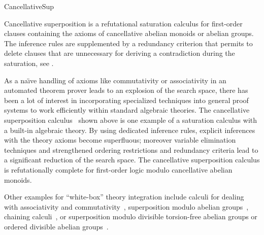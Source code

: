 \begin{entry}{CancellativeSup}
\begin{clarifications}
Cancellative superposition is a refutational saturation calculus for
first-order clauses containing the axioms of
cancellative abelian monoids or abelian groups.
The inference rules are supplemented by a redundancy criterion
that permits to delete clauses that are unnecessary for
deriving a contradiction during the saturation, see .
\end{clarifications}

\begin{history}
As a na{\"\i}ve handling of axioms like commutativity or associativity
in an automated theorem prover
leads to an explosion of the search space,
there has been a lot of interest in
incorporating specialized techniques into general proof systems
to work efficiently within standard algebraic theories.
The cancellative superposition calculus~\cite{GanzingerWaldmann1996CADE}
shown above
is one example of a saturation calculus with a built-in algebraic theory.
By using dedicated inference rules,
explicit inferences with the theory axioms become superfluous;
moreover variable elimination techniques
and strengthened ordering restrictions and redundancy criteria
lead to a significant reduction of the search space.
The cancellative superposition calculus is refutationally complete for
first-order logic modulo cancellative abelian monoids.

Other examples for ``white-box'' theory integration include
calculi for dealing with associativity and
commutativity~\cite{Plotkin1972,Slagle1974JACM,RusinowitchVigneron1995,BachmairGanzinger1994CTRS},
superposition modulo abelian groups~\cite{GodoyNieuwenhuis2004},
chaining calculi~\cite{Slagle1972JACM,Hines1992JAR,BachmairGanzinger1994LICS,BachmairGanzinger1994CADE},
or superposition modulo
divisible torsion-free abelian groups
or ordered divisible abelian groups~\cite{Waldmann2002abJSC,Waldmann2001IJCAR}.

\end{history}





\end{entry}

